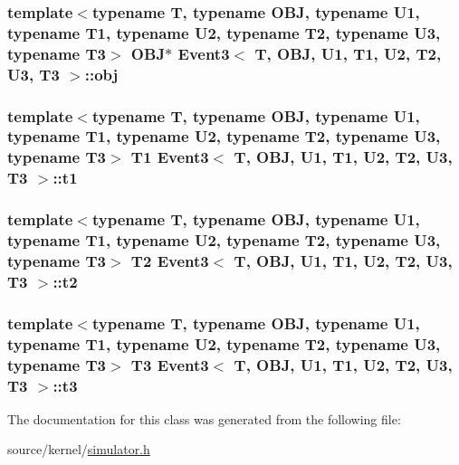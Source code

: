 \hypertarget{classEvent3_df320f52db00df12079299c183cb84d0}{
\subsubsection[{obj}]{\setlength{\rightskip}{0pt plus 5cm}template$<$typename T, typename OBJ, typename U1, typename T1, typename U2, typename T2, typename U3, typename T3$>$ OBJ$\ast$ {\bf Event3}$<$ T, OBJ, U1, T1, U2, T2, U3, T3 $>$::{\bf obj}}}
\label{classEvent3_df320f52db00df12079299c183cb84d0}


\hypertarget{classEvent3_d42449bd6cd4193bfb6557dc54c51eb8}{
\subsubsection[{t1}]{\setlength{\rightskip}{0pt plus 5cm}template$<$typename T, typename OBJ, typename U1, typename T1, typename U2, typename T2, typename U3, typename T3$>$ T1 {\bf Event3}$<$ T, OBJ, U1, T1, U2, T2, U3, T3 $>$::{\bf t1}}}
\label{classEvent3_d42449bd6cd4193bfb6557dc54c51eb8}


\hypertarget{classEvent3_40afc3cdc9d75a5b3163795b78a42497}{
\subsubsection[{t2}]{\setlength{\rightskip}{0pt plus 5cm}template$<$typename T, typename OBJ, typename U1, typename T1, typename U2, typename T2, typename U3, typename T3$>$ T2 {\bf Event3}$<$ T, OBJ, U1, T1, U2, T2, U3, T3 $>$::{\bf t2}}}
\label{classEvent3_40afc3cdc9d75a5b3163795b78a42497}


\hypertarget{classEvent3_7aa650837c6a02999bcad51817b144ef}{
\subsubsection[{t3}]{\setlength{\rightskip}{0pt plus 5cm}template$<$typename T, typename OBJ, typename U1, typename T1, typename U2, typename T2, typename U3, typename T3$>$ T3 {\bf Event3}$<$ T, OBJ, U1, T1, U2, T2, U3, T3 $>$::{\bf t3}}}
\label{classEvent3_7aa650837c6a02999bcad51817b144ef}




The documentation for this class was generated from the following file:\begin{CompactItemize}
\item 
source/kernel/\hyperlink{simulator_8h}{simulator.h}\end{CompactItemize}
